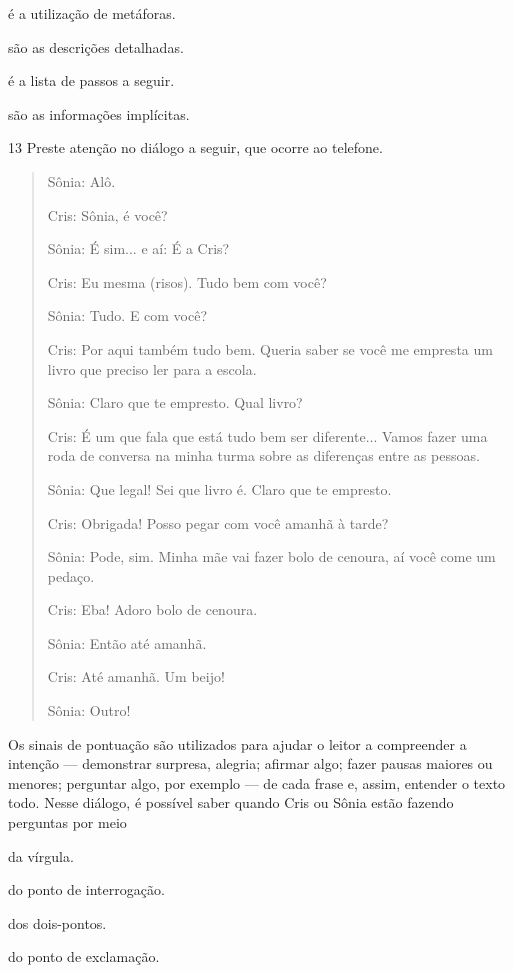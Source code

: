 \begin{escolha}
\item é a utilização de metáforas.

\item são as descrições detalhadas.

\item é a lista de passos a seguir.

\item são as informações implícitas.
\end{escolha}

\num{13} Preste atenção no diálogo a seguir, que ocorre ao telefone.

\begin{quote}
Sônia: Alô.

Cris: Sônia, é você?

Sônia: É sim... e aí: É a Cris?

Cris: Eu mesma (risos). Tudo bem com você?

Sônia: Tudo. E com você?

Cris: Por aqui também tudo bem. Queria saber se você me empresta um
livro que preciso ler para a escola.

Sônia: Claro que te empresto. Qual livro?

Cris: É um que fala que está tudo bem ser diferente... Vamos fazer uma
roda de conversa na minha turma sobre as diferenças entre as pessoas.

Sônia: Que legal! Sei que livro é. Claro que te empresto.

Cris: Obrigada! Posso pegar com você amanhã à tarde?

Sônia: Pode, sim. Minha mãe vai fazer bolo de cenoura, aí você come um
pedaço.

Cris: Eba! Adoro bolo de cenoura.

Sônia: Então até amanhã.

Cris: Até amanhã. Um beijo!

Sônia: Outro!

\end{quote}

Os sinais de pontuação são utilizados para ajudar o leitor a compreender
a intenção --- demonstrar surpresa, alegria; afirmar algo; fazer
pausas maiores ou menores; perguntar algo, por exemplo --- de cada
frase e, assim, entender o texto todo. Nesse diálogo, é possível saber
quando Cris ou Sônia estão fazendo perguntas por meio

\begin{escolha}
\item da vírgula.

\item do ponto de interrogação.

\item dos dois-pontos.

\item do ponto de exclamação.
\end{escolha}


